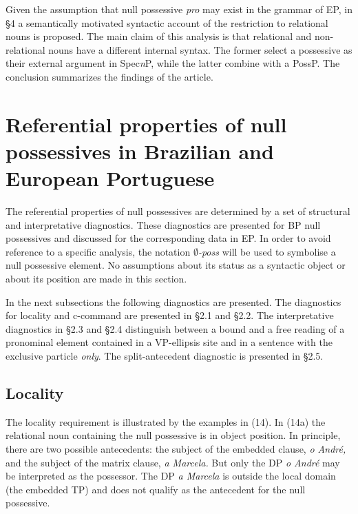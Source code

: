 \documentclass[output=paper]{langsci/langscibook}
\begin{document}
Given the assumption that null possessive \textit{pro} may exist in the grammar of EP, in §4 a semantically motivated syntactic account of the restriction to relational nouns is proposed. The main claim of this analysis is that relational and non-relational nouns have a different internal syntax. The former select a possessive as their external argument in Spec\textit{n}P, while the latter combine with a PossP. The conclusion summarizes the findings of the article.

\section{Referential properties of null possessives in Brazilian and European Portuguese}%

The referential properties of null possessives are determined by a set of structural and interpretative diagnostics. These diagnostics are presented for BP null possessives and discussed for the corresponding data in EP. In order to avoid reference to a specific analysis, the notation \textit{$\emptyset$-poss} will be used to symbolise a null possessive element. No assumptions about its status as a syntactic object or about its position are made in this section.  

In the next subsections the following diagnostics are presented. The diagnostics for locality and c-command are presented in §2.1 and §2.2. The interpretative diagnostics in §2.3 and §2.4 distinguish between a bound and a free reading of a pronominal element contained in a VP-ellipsis site and in a sentence with the exclusive particle \textit{only}. The split-antecedent diagnostic is presented in §2.5.

\subsection{Locality}%

The locality requirement is illustrated by the examples in (14). In (14a) the relational noun containing the null possessive is in object position. In principle, there are two possible antecedents: the subject of the embedded clause, \textit{o André,} and the subject of the matrix clause, \textit{a Marcela.} But only the DP \textit{o André} may be interpreted as the possessor. The DP \textit{a Marcela} is outside the local domain (the embedded TP) and does not qualify as the antecedent for the null possessive. 
\end{document}
